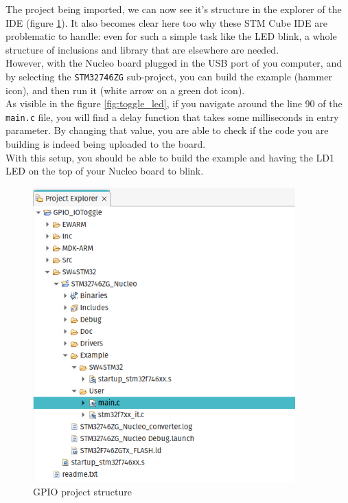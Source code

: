 \documentclass[10pt]{article}
\begin{document}
The project being imported, we can now see it's structure in the explorer of the IDE (figure \ref{fig:tree}). It also becomes clear here too why these STM Cube IDE are problematic to handle: even for such a simple task like the LED blink, a whole structure of inclusions and library that are elsewhere are needed.\\

However, with the Nucleo board plugged in the USB port of you computer, and by selecting the \verb|STM32746ZG| sub-project, you can build the example (hammer icon), and then run it (white arrow on a green dot icon).\\
As visible in the figure \ref{fig:toggle_led}, if you navigate around the line 90 of the \verb|main.c| file, you will find a delay function that takes some milliseconds in entry parameter. By changing that value, you are able to check if the code you are building is indeed being uploaded to the board.\\

With this setup, you should be able to build the example and having the LD1 LED on the top of your Nucleo board to blink.

\begin{figure}[h!]
  \centering
  \includegraphics[width=0.9\textwidth]{./img/tree.png}
  \caption{GPIO project structure}
  \label{fig:tree}
\end{figure}
\end{document}
